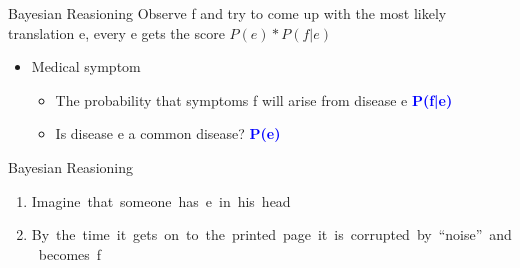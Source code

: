         \begin{block}{Bayesian Reasioning}
            Observe f and try to come up with the most likely translation e, every e gets the score $P(e)*P(f|e)$
            \begin{itemize}
                \item Medical symptom
                    \pause
                    \begin{itemize}
                        \item The probability that symptoms f will arise from disease e \textcolor{blue}{\textbf{P(f|e)}}
                    \pause
                        \item Is disease e a common disease? \textcolor{blue}{\textbf{P(e)}}
                    \end{itemize}
            \end{itemize}
        \end{block}
        
        \begin{block}{Bayesian Reasioning}
            \begin{enumerate}
                \item Imagine that someone has e in his head 
                \pause
                \item By the time it gets on to the printed page it is corrupted by “noise” and becomes f 
            \end{enumerate}
        \end{block}
